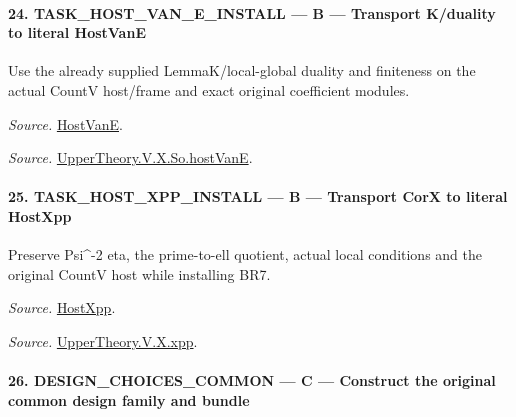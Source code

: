 \paragraph{24. TASK\_\allowbreak HOST\_\allowbreak VAN\_\allowbreak E\_\allowbreak INSTALL — B — Transport K/duality to literal HostVanE}

Use the already supplied LemmaK/local-global duality and finiteness on the actual CountV host/frame and exact original coefficient modules.

\emph{Source.} \href{https://github.com/CocoSgt/riemann-hypothesis-lean/blob/7cbf7a0c32fca1badf05931879a37c3f8a2b03b4/src/Development/AutomorphicArithmetic/AutomorphicVarieties/UnitaryThreeDeformations/HostNumber.lean#L9-L12}{HostVanE}.

\emph{Source.} \href{https://github.com/CocoSgt/riemann-hypothesis-lean/blob/7cbf7a0c32fca1badf05931879a37c3f8a2b03b4/src/Development/AutomorphicArithmetic/AutomorphicVarieties/LevelCohomology/SoHostVanE.lean#L11-L18}{UpperTheory.V.X.So.hostVanE}.



\paragraph{25. TASK\_\allowbreak HOST\_\allowbreak XPP\_\allowbreak INSTALL — B — Transport CorX to literal HostXpp}

Preserve Psi\textasciicircum{}-2 eta, the prime-to-ell quotient, actual local conditions and the original CountV host while installing BR7.

\emph{Source.} \href{https://github.com/CocoSgt/riemann-hypothesis-lean/blob/7cbf7a0c32fca1badf05931879a37c3f8a2b03b4/src/Development/AutomorphicArithmetic/AutomorphicVarieties/UnitaryThreeDeformations/HostNumber.lean#L14-L17}{HostXpp}.

\emph{Source.} \href{https://github.com/CocoSgt/riemann-hypothesis-lean/blob/7cbf7a0c32fca1badf05931879a37c3f8a2b03b4/src/Development/AutomorphicArithmetic/AutomorphicVarieties/LevelCohomology/Xpp.lean#L11-L84}{UpperTheory.V.X.xpp}.



\paragraph{26. DESIGN\_\allowbreak CHOICES\_\allowbreak COMMON — C — Construct the original common design family and bundle}

